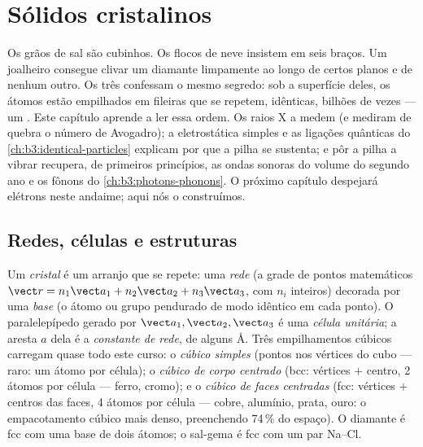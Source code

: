 \chapter{Sólidos cristalinos}\label{ch:b3:crystalline-solids}


Os grãos de sal são cubinhos. Os flocos de neve insistem em seis
braços. Um joalheiro consegue clivar um diamante limpamente ao longo de
certos planos e de nenhum outro. Os três confessam o mesmo segredo: sob
a superfície deles, os átomos estão empilhados em fileiras que se
repetem, idênticas, bilhões de vezes --- um \emph{}. Este
capítulo aprende a ler essa ordem. Os raios X a medem (e mediram de
quebra o número de Avogadro); a eletrostática simples e as ligações
quânticas do \cref{ch:b3:identical-particles} explicam por que a pilha
se sustenta; e pôr a pilha a vibrar recupera, de primeiros
princípios, as ondas sonoras do volume do segundo ano e os fônons do
\cref{ch:b3:photons-phonons}. O próximo capítulo despejará elétrons
neste andaime; aqui nós o construímos.

\section{Redes, células e estruturas}

\begin{definition}\label{def:b3:crystalline-solids:lattice}
Um \emph{cristal} é um arranjo que se repete: uma \emph{rede} (a
grade de pontos matemáticos $\vect r = n_1\vect a_1 + n_2\vect a_2
+ n_3\vect a_3$, com $n_i$ inteiros) decorada por uma \emph{base} (o
átomo ou grupo pendurado de modo idêntico em cada ponto). O
paralelepípedo gerado por $\vect a_1, \vect a_2, \vect a_3$ é uma
\emph{célula unitária}; a aresta $a$ dela é a \emph{constante de
rede}, de alguns \unit{\angstrom}. Três empilhamentos cúbicos carregam
quase todo este curso: o \emph{cúbico simples} (pontos nos vértices do
cubo --- raro: um átomo por célula); o \emph{cúbico de corpo centrado}
(bcc: vértices $+$ centro, 2 átomos por célula --- ferro, cromo); e o
\emph{cúbico de faces centradas} (fcc: vértices $+$ centros das faces,
4 átomos por célula --- cobre, alumínio, prata, ouro: o empacotamento
cúbico mais denso, preenchendo 74\,\% do espaço). O diamante é fcc com
uma base de dois átomos; o sal-gema é fcc com um par Na--Cl.
\end{definition}

